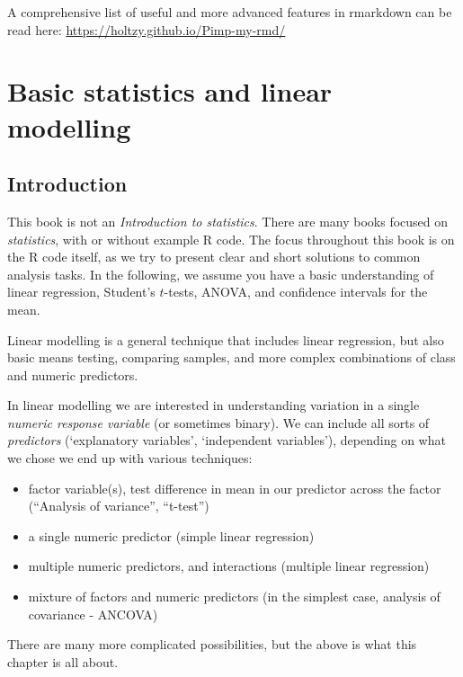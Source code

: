 \documentclass[]{book}
\providecommand{\tightlist}{%
  \setlength{\itemsep}{0pt}\setlength{\parskip}{0pt}}
\let\BeginKnitrBlock\begin \let\EndKnitrBlock\end
\begin{document}
\BeginKnitrBlock{rmdreading}
A comprehensive list of useful and more advanced features in rmarkdown can be read here: \url{https://holtzy.github.io/Pimp-my-rmd/}
\EndKnitrBlock{rmdreading}

\hypertarget{linmodel}{%
\chapter{Basic statistics and linear modelling}\label{linmodel}}

\hypertarget{introduction-2}{%
\section{Introduction}\label{introduction-2}}

This book is not an \emph{Introduction to statistics}. There are many books focused on \emph{statistics}, with or without example R code. The focus throughout this book is on the R code itself, as we try to present clear and short solutions to common analysis tasks. In the following, we assume you have a basic understanding of linear regression, Student's \(t\)-tests, ANOVA, and confidence intervals for the mean.

Linear modelling is a general technique that includes linear regression, but also basic means testing, comparing samples, and more complex combinations of class and numeric predictors.

In linear modelling we are interested in understanding variation in a single \emph{numeric response variable} (or sometimes binary). We can include all sorts of \emph{predictors} (`explanatory variables', `independent variables'), depending on what we chose we end up with various techniques:

\begin{itemize}
\tightlist
\item
  factor variable(s), test difference in mean in our predictor across the factor (``Analysis of variance'', ``t-test'')
\item
  a single numeric predictor (simple linear regression)
\item
  multiple numeric predictors, and interactions (multiple linear regression)
\item
  mixture of factors and numeric predictors (in the simplest case, analysis of covariance - ANCOVA)
\end{itemize}

There are many more complicated possibilities, but the above is what this chapter is all about.
\end{document}
